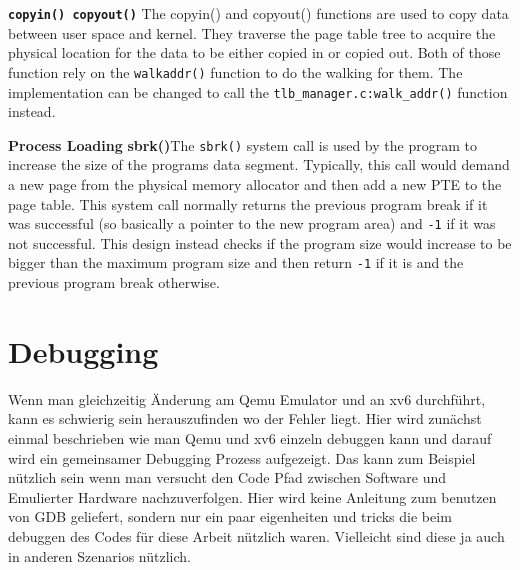\textbf{\texttt{copyin() copyout()}} The copyin() and copyout() functions are used to copy data between
user space and kernel. They traverse the page table tree to acquire the physical location for the data
to be either copied in or copied out.
Both of those function rely on the \texttt{walkaddr()} function to do the walking for them.
The implementation can be changed to call the \texttt{tlb\_manager.c:walk\_addr()} function instead.

\textbf{Process Loading} %
\textbf{sbrk()}The \texttt{sbrk()} system call is used by the program to increase the size
of the programs data segment. Typically, this call would demand a new page from the physical memory allocator
and then add a new PTE to the page table.
This system call normally returns the previous program break if it was successful (so basically a pointer to
the new program area) and \texttt{-1} if it was not successful.
This design instead checks if the program size would increase to be bigger than the maximum program size and
then return \texttt{-1} if it is and the previous program break otherwise.






\section{Debugging}
Wenn man gleichzeitig Änderung am Qemu Emulator und an xv6 durchführt, kann es schwierig sein
herauszufinden wo der Fehler liegt. Hier wird zunächst einmal beschrieben wie man Qemu und
xv6 einzeln debuggen kann und darauf wird ein gemeinsamer Debugging Prozess aufgezeigt.
Das kann zum Beispiel nützlich sein wenn man versucht den Code Pfad zwischen Software und
Emulierter Hardware nachzuverfolgen.
Hier wird keine Anleitung zum benutzen von GDB geliefert, sondern nur ein paar eigenheiten
und tricks die beim debuggen des Codes für diese Arbeit nützlich waren. Vielleicht sind
diese ja auch in anderen Szenarios nützlich.

